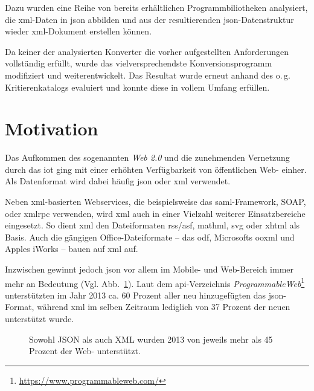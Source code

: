 Dazu wurden eine Reihe von bereits erhältlichen Programmbiliotheken analysiert,
die \acrshort{xml}-Daten in \acrshort{json} abbilden und aus der resultierenden
\acrshort{json}-Datenstruktur wieder \acrshort{xml}-Dokument erstellen können.


Da keiner der analysierten Konverter die vorher aufgestellten Anforderungen
vollständig erfüllt, wurde das vielversprechendste Konversionsprogramm
modifiziert und weiterentwickelt. Das Resultat wurde erneut anhand des o.\,g.
Kritierenkatalogs evaluiert und konnte diese in vollem Umfang erfüllen.

\section{Motivation}
\label{sec:motivation}
Das Aufkommen des sogenannten \emph{Web 2.0} und die zunehmenden Vernetzung
durch das \gls{iot} ging mit einer erhöhten
Verfügbarkeit von öffentlichen Web- einher. Als Datenformat wird dabei
häufig \acrshort{json} oder \acrshort{xml} verwendet.

Neben \acrshort{xml}-basierten Webservices, die beispielsweise das \acrshort{saml}-Framework, SOAP,
oder \gls{xmlrpc} verwenden, wird \acrshort{xml} auch in einer Vielzahl weiterer
Einsatzbereiche eingesetzt. So dient \acrshort{xml} den Dateiformaten \acrshort{rss}/\acrshort{asf}, \acrshort{mathml},
\gls{svg} oder \gls{xhtml} als Basis. Auch die gängigen
Office-Dateiformate -- das \acrfull{odf}, Microsofts %
\acrfull{ooxml} und Apples iWorks -- bauen auf \acrshort{xml} auf. %

Inzwischen gewinnt jedoch \acrshort{json} vor allem im Mobile-
und Web-Bereich immer mehr an Bedeutung (Vgl. Abb.~\ref{fig:xmljsonapis}). Laut dem \acrshort{api}-Verzeichnis
\emph{ProgrammableWeb}\footnote{\url{https://www.programmableweb.com/}} unterstützten im Jahr 2013 ca. 60 Prozent aller neu
hinzugefügten  das \acrshort{json}-Format, während
\acrshort{xml} im selben Zeitraum lediglich von 37 Prozent der neuen 
unterstützt wurde.~\cite{duvander2013convergence}

\begin{figure}[h!]
    \begin{center}
        
    \end{center}
    \caption{Sowohl JSON als auch XML wurden 2013 von jeweils mehr als 45 Prozent der Web- unterstützt.}
    \label{fig:xmljsonapis}
\end{figure}


